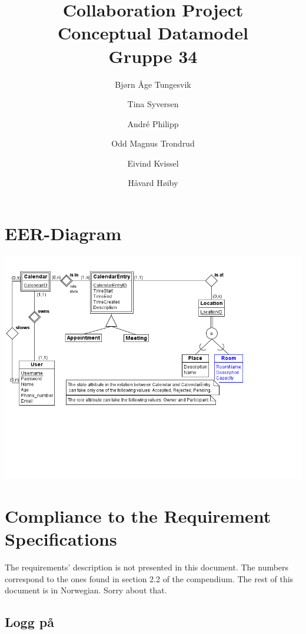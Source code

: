 \documentclass{article}
\begin{document}
\begin{titlepage}
\title{Collaboration Project\\
\textbf{Conceptual Datamodel}\\
Gruppe 34}
\author{Bj\o rn \AA ge Tungesvik\and Tina Syversen\and Andr\'e Philipp\and Odd Magnus Trondrud\and Eivind Kvissel\and H\aa vard H\o iby}
\maketitle
\end{titlepage}

\bigskip

\section{EER-Diagram}

\includegraphics[scale=0.75]{EER_diagram.png} \newpage

\section{Compliance to the Requirement Specifications}

The requirements' description is not presented in this document. The numbers
correspond to the ones found in section 2.2 of the compendium. The rest of
this document is in Norwegian. Sorry about that.

\subsection{Logg p\aa }
\end{document}
